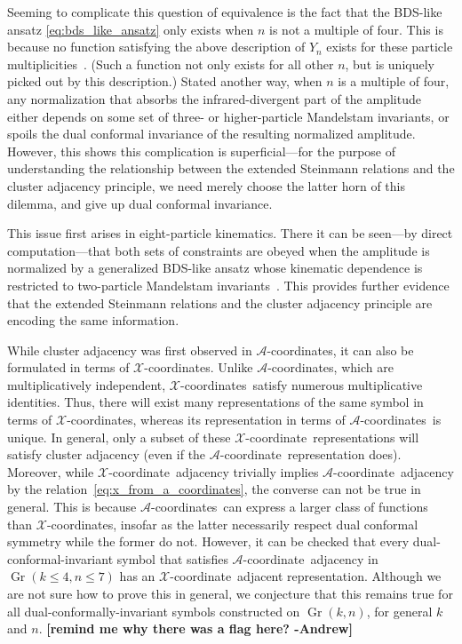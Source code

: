 \documentclass[11pt]{article}
\DeclareMathOperator{\Gr}{Gr}
\def\xcoord{$\mathcal{X}$-coordinate}
\def\xcoords{$\mathcal{X}$-coordinates}
\def\acoord{$\mathcal{A}$-coordinate}
\def\acoords{$\mathcal{A}$-coordinates}
\def\draftnote#1{{\bf [#1]}}
\begin{document}
Seeming to complicate this question of equivalence is the fact that the BDS-like ansatz \eqref{eq:bds_like_ansatz} only exists when $n$ is not a multiple of four. This is because no function satisfying the above description of $Y_n$ exists for these particle multiplicities~\cite{Yang:2010az,Dixon:2016nkn}. (Such a function not only exists for all other $n$, but is uniquely picked out by this description.) Stated another way, when $n$ is a multiple of four, any normalization that absorbs the infrared-divergent part of the amplitude either depends on some set of three- or higher-particle Mandelstam invariants, or spoils the dual conformal invariance of the resulting normalized amplitude. However, this shows this complication is superficial---for the purpose of understanding the relationship between the extended Steinmann relations and the cluster adjacency principle, we need merely choose the latter horn of this dilemma, and give up dual conformal invariance. 

This issue first arises in eight-particle kinematics. There it can be seen---by direct computation---that both sets of constraints are obeyed when the amplitude is normalized by a generalized BDS-like ansatz whose kinematic dependence is restricted to two-particle Mandelstam invariants~\cite{cluster_subalgebras_ii}. This provides further evidence that the extended Steinmann relations and the cluster adjacency principle are encoding the same information.

While cluster adjacency was first observed in \acoords, it can also be formulated in terms of \xcoords. Unlike \acoords, which are multiplicatively independent, \xcoords\ satisfy numerous multiplicative identities. Thus, there will exist many representations of the same symbol in terms of \xcoords, whereas its representation in terms of \acoords\ is unique. In general, only a subset of these \xcoord\ representations will satisfy cluster adjacency (even if the \acoord\ representation does). Moreover, while \xcoord\ adjacency trivially implies \acoord\ adjacency by the relation~\eqref{eq:x_from_a_coordinates}, the converse can not be true in general. This is because \acoords\ can express a larger class of functions than \xcoords, insofar as the latter necessarily respect dual conformal symmetry while the former do not. However, it can be checked that every dual-conformal-invariant symbol that satisfies \acoord\ adjacency in $\Gr(k\le4,n\le7)$ has an \xcoord\ adjacent representation. Although we are not sure how to prove this in general, we conjecture that this remains true for all dual-conformally-invariant symbols constructed on $\Gr(k,n)$, for general $k$ and $n$.  \draftnote{remind me why there was a flag here? -Andrew}
\end{document}
